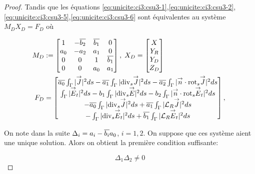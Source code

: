 \begin{proof}
    Tandis que les équations \eqref{eq:unicite:ci3:csu3-1},\eqref{eq:unicite:ci3:csu3-2},\eqref{eq:unicite:ci3:csu3-5},\eqref{eq:unicite:ci3:csu3-6} sont équivalentes au système \(M_D X_D= F_D\) où

    \begin{align*}
      M_D&:=
      \begin{bmatrix}
        1&-{\overline{b_2}}&{\overline{b_1}}&0\\
        a_0&-a_2&a_1&0\\
        0&0&1&{\overline{b_1}}\\
        0&0&a_0&a_1\\
      \end{bmatrix},\;
      X_D =
      \begin{bmatrix}
        X\\
        Y_R\\
        Y_D\\
        Z_D
      \end{bmatrix}\\
      F_D &=
      \begin{bmatrix}
        {\overline{a_0}} \int_\Gamma |{\overset{\rightarrow}{J}}|^2ds - {\overline{a_1}} \int_\Gamma |{\operatorname{div}_s} {\overset{\rightarrow}{J}}|^2 ds - {\overline{a_2}} \int_\Gamma |{\overset{\rightarrow}{n}} \cdot {{\operatorname{rot}}_s} {\overset{\rightarrow}{J}}|^2 ds \\
        \int_\Gamma |{\overset{\rightarrow}{E}}_t|^2 ds  - b_1 \int_\Gamma | {\operatorname{div}_s} {\overset{\rightarrow}{E}} |^2 ds - b_2 \int_\Gamma | {\overset{\rightarrow}{n}} \cdot {{\operatorname{rot}}_s} {\overset{\rightarrow}{E}}_t|^2 ds \\
        -{\overline{a_0}} \int_\Gamma |{\operatorname{div}_s} {\overset{\rightarrow}{J}}|^2ds + {\overline{a_1}} \int_\Gamma | {\mathcal{L}_R} {\overset{\rightarrow}{J}}|^2 ds \\
        -\int_\Gamma | {\operatorname{div}_s} {\overset{\rightarrow}{E}}_t |^2 ds  + {\overline{b_1}} \int_\Gamma | {\mathcal{L}_R} {\overset{\rightarrow}{E}}_t|^2 ds
      \end{bmatrix},\;
    \end{align*}

    On note dans la suite \(\Delta_i = a_i-{\overline{b_i}}a_0\), \(i=1,2\). On suppose que ces système aient une unique solution. Alors on obtient la première condition suffisante:

    \begin{equation}
      \label{eq:unicite:ci3:csu3-cn-det}
      \Delta_1\Delta_2 \not = 0
    \end{equation}


\end{proof}
